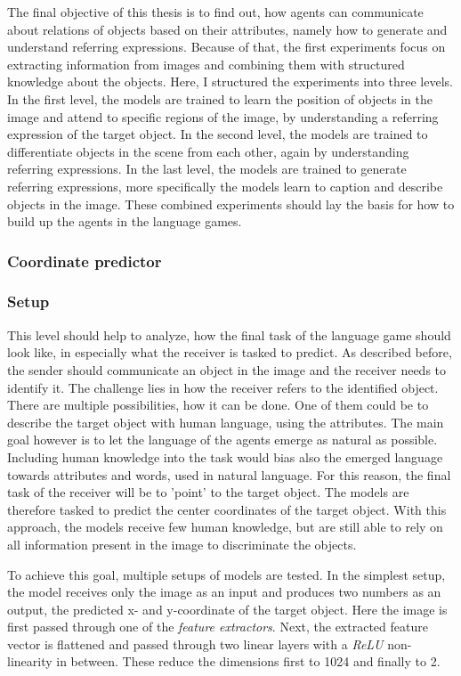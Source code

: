 The final objective of this thesis is to find out, how agents can communicate about relations of objects based on their attributes, namely how to generate and understand referring expressions.
Because of that, the first experiments focus on extracting information from images and combining them with structured knowledge about the objects.
Here, I structured the experiments into three levels.
In the first level, the models are trained to learn the position of objects in the image and attend to specific regions of the image, by understanding a referring expression of the target object.
In the second level, the models are trained to differentiate objects in the scene from each other, again by understanding referring expressions.
In the last level, the models are trained to generate referring expressions, more specifically the models learn to caption and describe objects in the image.
These combined experiments should lay the basis for how to build up the agents in the language games.

\subsubsection{Coordinate predictor}
\subsubsection*{Setup}

This level should help to analyze, how the final task of the language game should look like, in especially what the receiver is tasked to predict.
As described before, the sender should communicate an object in the image and the receiver needs to identify it.
The challenge lies in how the receiver refers to the identified object.
There are multiple possibilities, how it can be done.
One of them could be to describe the target object with human language, using the attributes.
The main goal however is to let the language of the agents emerge as natural as possible.
Including human knowledge into the task would bias also the emerged language towards attributes and words, used in natural language.
For this reason, the final task of the receiver will be to 'point' to the target object.
The models are therefore tasked to predict the center coordinates of the target object.
With this approach, the models receive few human knowledge, but are still able to rely on all information present in the image to discriminate the objects.

To achieve this goal, multiple setups of models are tested.
In the simplest setup, the model receives only the image  as an input and produces two numbers as an output, the predicted x- and y-coordinate of the target object.
Here the image is first passed through one of the \emph{feature extractors}.
Next, the extracted feature vector is flattened and passed through two linear layers with a \emph{ReLU} non-linearity in between.
These reduce the dimensions first to 1024 and finally to 2.

